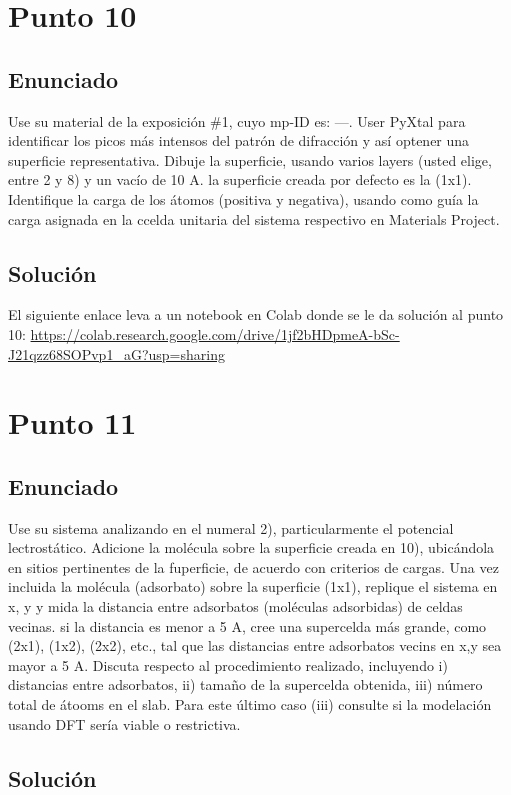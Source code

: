 \documentclass[a4paper,12pt]{article}
\begin{document}
\section{Punto 10}
\subsection*{Enunciado}
Use su material de la exposición \#1, cuyo mp-ID es: ---. User PyXtal para identificar los picos más intensos del patrón de difracción y así optener una superficie representativa. Dibuje la superficie, usando varios layers (usted elige, entre 2 y 8) y un vacío de 10 A. la superficie creada por defecto es la (1x1). Identifique la carga de los átomos (positiva y negativa), usando como guía la carga asignada en la ccelda unitaria del sistema respectivo en Materials Project.
\subsection*{Solución}
El siguiente enlace leva a un notebook en Colab donde se le da solución al punto 10: \url{https://colab.research.google.com/drive/1jf2bHDpmeA-bSc-J21qzz68SOPvp1_aG?usp=sharing}
\section{Punto 11}
\subsection*{Enunciado}
Use su sistema analizando en el numeral 2), particularmente el potencial lectrostático. Adicione la molécula sobre la superficie creada en 10), ubicándola en sitios pertinentes de la fuperficie, de acuerdo con criterios de cargas. Una vez incluida la molécula (adsorbato) sobre la superficie (1x1), replique el sistema en x, y y mida la distancia entre adsorbatos (moléculas adsorbidas) de celdas vecinas. si la distancia es menor a 5 A, cree una supercelda más grande, como (2x1), (1x2), (2x2), etc., tal que las distancias entre adsorbatos vecins en x,y sea mayor a 5 A. Discuta respecto al procedimiento realizado, incluyendo i) distancias entre adsorbatos, ii) tamaño de la supercelda obtenida, iii) número total de átooms en el slab. Para este último caso (iii) consulte si la modelación usando DFT sería viable o restrictiva.
\subsection*{Solución}
\end{document}
